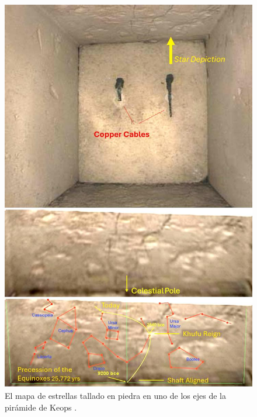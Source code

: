 \documentclass[10pt,twocolumn,letterpaper]{article}
\begin{document}
\begin{figure}[H]
\begin{center}
   \includegraphics[width=1\linewidth]{star-stone.jpg}
\end{center}
   \caption{El mapa de estrellas tallado en piedra en uno de los ejes de la pirámide de Keops \cite{28}.}
\label{fig:20}
\label{fig:onecol}
\end{figure}
\end{document}
